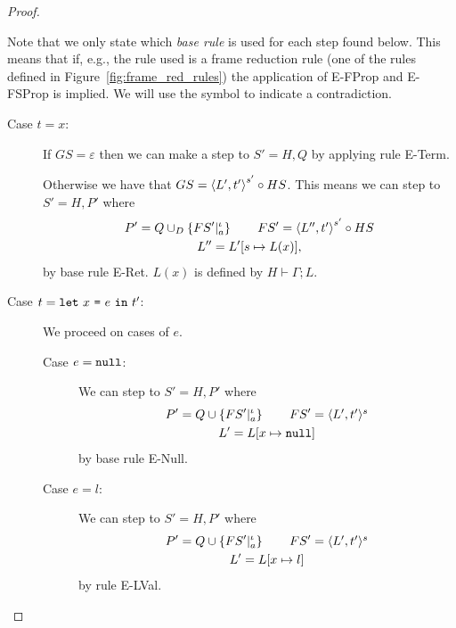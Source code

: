 \begin{proof}
  \begin{note}
    Note that we only state which \emph{base rule} is used for each step found below.
    This means that if, e.g., the rule used is a frame reduction rule (one of the
    rules defined in Figure~\ref{fig:frame_red_rules}) the application of {\sc
    E-FProp} and {\sc E-FSProp} is implied. We will use the symbol \lightning to
    indicate a contradiction.
  \end{note}

  \begin{description}
    \item[Case $t = x$:] 
      If $GS = \varepsilon$ then we can make a step to $S' = H, Q$ by applying
      rule {\sc E-Term}. \contradiction

      Otherwise we have that $GS = \mbox{$\langle L', t' \rangle$}^{s'} \circ HS$. This means we
      can step to $S' = H, P'$ where
      \begin{equation*}
        \begin{gathered}
          P' = Q \cup_D \left\{ FS'|_a^\iota \right\} \quad\quad FS' = \mbox{$\langle L'',
          t' \rangle$}^{s'} \circ HS \\ 
          L'' = L'[s \mapsto L(x)],
        \end{gathered} \end{equation*}
      by base rule {\sc E-Ret}. $L(x)$ is defined by $H \vdash \Gamma; L$. \contradiction
    
    \item[Case $t = \mbox{\mdseries\texttt{let}~$x$~\texttt{=}~$e$~\texttt{in}~$t'$}$:]
      We proceed on cases of $e$.
      \begin{description}
        \item[Case $e = \mbox{\mdseries\texttt{null}}$:] 
          We can step to $S' = H, P'$ where
          \begin{equation*}
            \begin{gathered}
              P' = Q \cup \left\{FS'|_a^\iota \right\} \quad\quad FS' = \mbox{$\langle L',
              t' \rangle^s$} \\
              L' = L[x \mapsto \mbox{\mdseries\texttt{null}}]
            \end{gathered}
          \end{equation*}
          by base rule {\sc E-Null}. \contradiction

        \item[Case $e = l$:]
          We can step to $S' = H, P'$ where 
          \begin{equation*}
            \begin{gathered}
              P' = Q \cup \left\{FS'|_a^\iota \right\} \quad\quad FS' = \mbox{$\langle L',
              t' \rangle^s$} \\
              L' = L[x \mapsto l]
            \end{gathered}
          \end{equation*}
          by rule {\sc E-LVal}. \contradiction


\end{description}
\end{description}
\end{proof}
